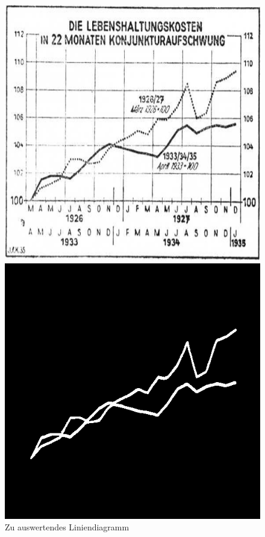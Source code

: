 \begin{figure}[h!] %
    \centering
    \begin{minipage}{0.315\textwidth} %
        \centering
        \includegraphics[width=\linewidth]{Implementation/img/alg_input.png}
        \caption{ Zu auswertendes Liniendiagramm}
        \label{fig:alg_input}
    \end{minipage}\hfill %
    \begin{minipage}{0.315\textwidth} %
        \centering
        \includegraphics[width=\linewidth]{Implementation/img/alg_pred.png}

\end{minipage}
\end{figure}
